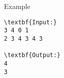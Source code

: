 Example
\begin{verbatim}
\textbf{Input:}
3 4 0 1
2 3 4 3 4 3 

\textbf{Output:}
4
3 

\end{verbatim}